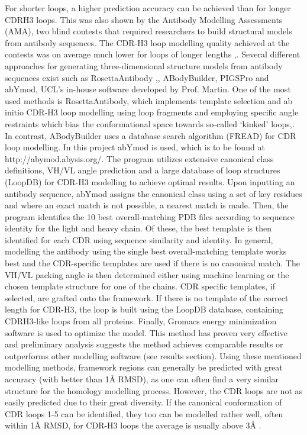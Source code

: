 \documentclass[preprint,12pt]{elsarticle}
\begin{document}
For shorter loops, a higher prediction accuracy can be achieved than for longer CDRH3 loops. This was also shown by the Antibody Modelling Assessments (AMA), two blind contests that required researchers to build structural models from antibody sequences. The CDR-H3 loop modelling quality achieved at the contests was on average much lower for loops of longer lengths \cite{Almagro2011},\cite{Almagro2014}. 
Several different approaches for generating three-dimensional structure models from antibody sequences exist such as RosettaAntibody \cite{Sircar2009},\cite{Sivasubramanian2009}, ABodyBuilder\cite{Leem2016}, PIGSPro\cite{Lepore2017} and abYmod, UCL’s in-house software developed by Prof. Martin. One of the most used methods is RosettaAntibody, which implements template selection and ab initio CDR-H3 loop modelling using loop fragments and employing specific angle restraints which bias the conformational space towards so-called ‘kinked’ loops\cite{Schoeder2021},\cite{Weitzner2017}. In contrast, ABodyBuilder uses a database search algorithm (FREAD\cite{Choi2010}) for CDR loop modelling. 
In this project abYmod is used, which is to be found at http://abymod.abysis.org/. The program utilizes extensive canonical class definitions, VH/VL angle prediction and a large database of loop structures (LoopDB) for CDR-H3 modelling to achieve optimal results. Upon inputting an antibody sequence, abYmod assigns the canonical class using a set of key residues \cite{Martin1996}and where an exact match is not possible, a nearest match is made. Then, the program identifies the 10 best overall-matching PDB files according to sequence identity for the light and heavy chain. Of these, the best template is then identified for each CDR using sequence similarity and identity. In general, modelling the antibody using the single best overall-matching template works best and the CDR-specific templates are used if there is no canonical match. The VH/VL packing angle is then determined either using machine learning or the chosen template structure for one of the chains. CDR specific templates, if selected, are grafted onto the framework. If there is no template of the correct length for CDR-H3, the loop is built using the LoopDB database, containing CDRH3-like loops from all proteins. Finally, Gromacs energy minimization software is used to optimize the model. This method has proven very effective and preliminary analysis suggests the method achieves comparable results or outperforms other modelling software (see results section). 
 Using these mentioned modelling methods, framework regions can generally be predicted with great accuracy (with better than 1Å RMSD\cite{Almagro2014}), as one can often find a very similar structure for the homology modelling process.  However, the CDR loops are not as easily predicted due to their great diversity. If the canonical conformation of CDR loops 1-5 can be identified, they too can be modelled rather well, often within 1Å RMSD, for CDR-H3 loops the average is usually above 3Å \cite{Almagro2011}. 
\end{document}

